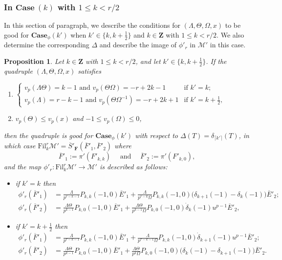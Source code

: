 \documentclass[11pt]{amsart}
\theoremstyle{definition}
\numberwithin{equation}{subsection}
\theoremstyle{plain}
\theoremstyle{plain}
\theoremstyle{plain}
\theoremstyle{plain}
\theoremstyle{plain}
\theoremstyle{plain}
\theoremstyle{plain}
\theoremstyle{plain}
\newtheorem{prop}[equation]{Proposition}
\theoremstyle{plain}
\theoremstyle{plain}
\theoremstyle{plain}
\theoremstyle{plain}
\theoremstyle{definition}
\theoremstyle{definition}
\theoremstyle{definition}
\theoremstyle{remark}
\renewcommand{\(}{\textup{(}}
\renewcommand{\)}{\textup{)}}
\newcommand{\Z}{\mathbf{Z}}
\newcommand{\F}{\mathbf{F}}
\newcommand{\barS}{\overline{S}}
\newcommand{\cM}{\mathcal{M}}
\newcommand{\Fil}{\mathrm{Fil}}
\newcommand{\barE}{\overline{E}}
\newcommand{\barF}{\overline{F}}
\begin{document}
\subsubsection{\textbf{In $\mathbf{Case}~(k)$ with $1\leq k<r/2$}}
In this section of paragraph, we describe the conditions for $(\Lambda,\Theta,\Omega,x)$ to be good for $\mathbf{Case}_\phi(k')$ when $k'\in\{k,k+\frac{1}{2}\}$ and $k\in\Z$ with $1\leq k< r/2$. We also determine the corresponding $\Delta$ and describe the image of $\phi'_r$ in $\cM'$ in this case.

\begin{prop}\label{prop-cM-Case-1-r/2}
Let $k\in\Z$ with $1\leq k< r/2$, and let $k'\in\{k,k+\frac{1}{2}\}$. If the quadruple $(\Lambda,\Theta,\Omega,x)$ satisfies
    \begin{enumerate}[leftmargin=*]
      \item $\begin{cases}
          v_p(\Lambda \Theta)=k-1\mbox{ and } v_p(\Theta\Omega)=-r+2k-1 & \mbox{if } k'=k; \\
          v_p(\Lambda)=r-k-1\mbox{ and } v_p(\Theta\Omega^{-1})=-r+2k+1 & \mbox{if } k'=k+\frac{1}{2},
        \end{cases}$
      \item $v_p(\Theta)\leq v_p(x)$ and $-1\leq v_p(\Omega)\leq 0$,
    \end{enumerate}
    then the quadruple is good for $\mathbf{Case}_\phi(k')$ with respect to $\Delta(T)=\delta_{\lceil k' \rceil}(T)$, in which case $\Fil^r_{k}\cM'=\barS'_\F(\barF'_1,\barF'_2)$ where
$$\barF'_1:=\pi'(F'_{k,k})\quad\mbox{ and }\quad\barF'_2:=\pi'(F'_{k,0}),$$
and the map
$\phi'_r:\Fil^r_{k}\cM'\to \cM'$ is described as follows:
\begin{itemize}[leftmargin=*]
\item if $k'=k$ then
    \begin{align*}
    \phi'_r(\barF'_1)  &=\frac{\Lambda}{p^{r-k-1}} P_{k,k}(-1,0)\barE'_1 +\frac{\Lambda}{p^{r-k}\Omega} P_{k,k}(-1,0)\big(\delta_{k+1}(-1)-\delta_k(-1)\big)\barE'_2;\\
    \phi'_r(\barF'_2)  &=\frac{\Lambda\Theta}{p^{k-1}}  P_{k,0}(-1,0)\barE'_1   +\frac{\Lambda\Theta}{p^{k-1}\Omega}P_{k,0}(-1,0)\dot{\delta}_k(-1)u^{p-1}\barE'_2,
    \end{align*}
\item if $k'=k+\frac{1}{2}$ then
    \begin{align*}
    \phi'_r(\barF'_1)   &= \frac{\Lambda}{p^{r-k-1}} P_{k,k}(-1,0)\barE'_1 +\frac{\Lambda}{p^{r-k-1}\Omega} P_{k,k}(-1,0)\dot{\delta}_{k+1}(-1)u^{p-1}\barE'_2;\\
    \phi'_r(\barF'_2)   &= \frac{\Lambda \Theta}{p^{k-1}} P_{k,0}(-1,0)\barE'_1 +\frac{\Lambda\Theta}{p^k\Omega}P_{k,0}(-1,0)\big(
        \delta_k(-1)-\delta_{k+1}(-1)
        \big)\barE'_2.
    \end{align*}
\end{itemize}
\end{prop}
\end{document}
